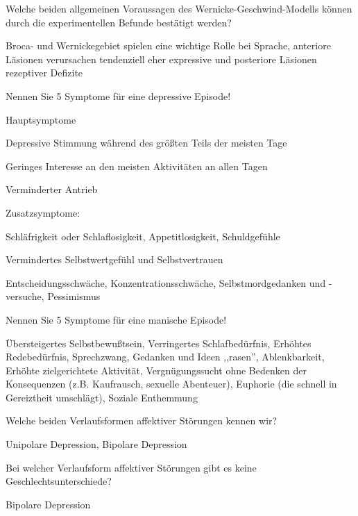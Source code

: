 \documentclass[10pt, a4paper]{exam}
\begin{document}
\begin{questions}
  \question Welche beiden allgemeinen Voraussagen des Wernicke-Geschwind-Modells können durch die experimentellen Befunde bestätigt werden?
  \begin{solution}
    Broca- und Wernickegebiet spielen eine wichtige Rolle bei Sprache, anteriore Läsionen verursachen tendenziell eher expressive und posteriore Läsionen rezeptiver Defizite
  \end{solution}

  \question Nennen Sie 5 Symptome für eine depressive Episode!
  \begin{solution}
    Hauptsymptome
    \begin{itemize*}
      \item Depressive Stimmung während des größten Teils der meisten Tage
      \item Geringes Interesse an den meisten Aktivitäten an allen Tagen
      \item Verminderter Antrieb
    \end{itemize*}
    Zusatzsymptome:
    \begin{itemize*}
      \item Schläfrigkeit oder Schlaflosigkeit, Appetitlosigkeit, Schuldgefühle
      \item Vermindertes Selbstwertgefühl und Selbstvertrauen
      \item Entscheidungsschwäche, Konzentrationsschwäche, Selbstmordgedanken und -versuche, Pessimismus
    \end{itemize*}
  \end{solution}

  \question Nennen Sie 5 Symptome für eine manische Episode!
  \begin{solution}
    Übersteigertes Selbstbewußtsein, Verringertes Schlafbedürfnis, Erhöhtes Redebedürfnis, Sprechzwang, Gedanken und Ideen ,,rasen'', Ablenkbarkeit, Erhöhte zielgerichtete Aktivität, Vergnügungssucht ohne Bedenken der Konsequenzen (z.B. Kaufrausch, sexuelle Abenteuer), Euphorie (die schnell in Gereiztheit umschlägt), Soziale Enthemmung
  \end{solution}

  \question Welche beiden Verlaufsformen affektiver Störungen kennen wir?
  \begin{solution}
    Unipolare Depression, Bipolare Depression
  \end{solution}

  \question Bei welcher Verlaufsform affektiver Störungen gibt es keine Geschlechtsunterschiede?
  \begin{solution}
    Bipolare Depression
  \end{solution}


\end{questions}
\end{document}
